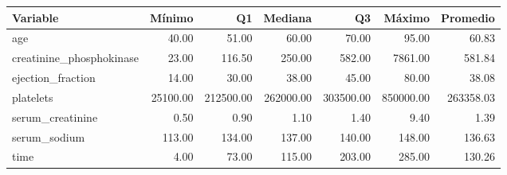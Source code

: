 \begin{table}[ht]
\centering
\begin{tabular}{lrrrrrr}
  \hline
Variable & Mínimo & Q1 & Mediana & Q3 & Máximo & Promedio \\ 
  \hline
age & 40.00 & 51.00 & 60.00 & 70.00 & 95.00 & 60.83 \\ 
  creatinine\_phosphokinase & 23.00 & 116.50 & 250.00 & 582.00 & 7861.00 & 581.84 \\ 
  ejection\_fraction & 14.00 & 30.00 & 38.00 & 45.00 & 80.00 & 38.08 \\ 
  platelets & 25100.00 & 212500.00 & 262000.00 & 303500.00 & 850000.00 & 263358.03 \\ 
  serum\_creatinine & 0.50 & 0.90 & 1.10 & 1.40 & 9.40 & 1.39 \\ 
  serum\_sodium & 113.00 & 134.00 & 137.00 & 140.00 & 148.00 & 136.63 \\ 
  time & 4.00 & 73.00 & 115.00 & 203.00 & 285.00 & 130.26 \\ 
   \hline
\end{tabular}
\end{table}

